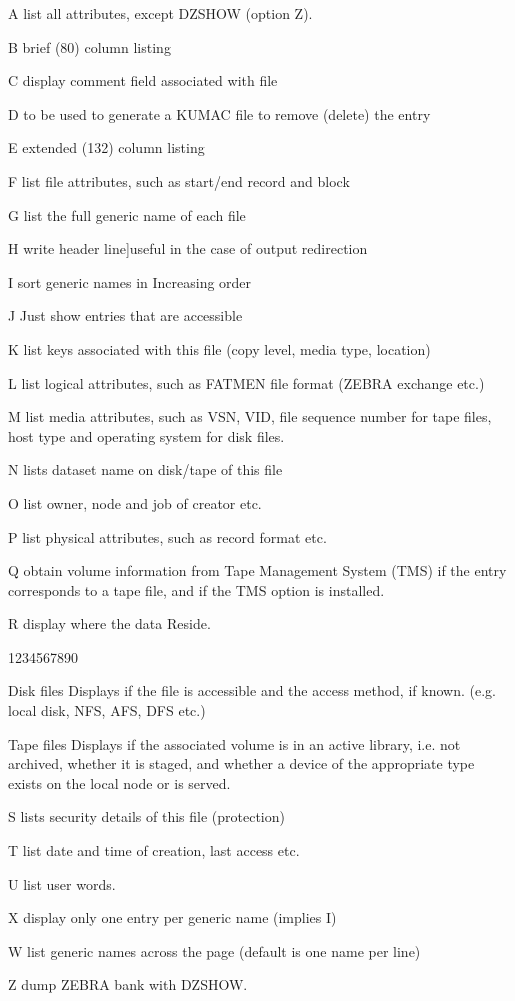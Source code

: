 \begin{DLtt}{12}
\item[A]list all attributes, except DZSHOW (option Z).
\item[B]brief (80) column listing
\item[C]display comment field associated with file
\item[D]to be used to generate a KUMAC file to remove (delete) the entry
\item[E]extended (132) column listing
\item[F]list file attributes, such as start/end record and block
\item[G]list the full generic name of each file
\item[H]write header line]useful in the case of output redirection 
\item[I]sort generic names in Increasing order
\item[J]Just show entries that are accessible
\item[K]list keys associated with this file (copy level, media type, location)
\item[L]list logical attributes, such as FATMEN file format
(ZEBRA exchange etc.)
\item[M]list media attributes, such as VSN, VID, file sequence number for tape
files, host type and operating system for disk files.
\item[N]lists dataset name on disk/tape of this file
\item[O]list owner, node and job of creator etc.
\item[P]list physical attributes, such as record format etc.
\item[Q]obtain volume information from Tape Management System (TMS)
if the entry corresponds to a tape file, and if the TMS
option is installed.
\item[R]display where the data Reside. 
\begin{DLtt}{1234567890}
\item[Disk files]Displays if the file is accessible and the access method, if
known. (e.g. local disk, NFS, AFS, DFS etc.)
\item[Tape files]Displays if the associated volume is in an active library,
i.e. not archived, whether it is staged, and whether a device of the appropriate
type exists on the local node or is served.
\end{DLtt}
\item[S]lists security details of this file (protection)
\item[T]list date and time of creation, last access etc.
\item[U]list user words.
\item[X]display only one entry per generic name (implies I)
\item[W]list generic names across the page (default is one name per line)
\item[Z]dump ZEBRA bank with DZSHOW.
\end{DLtt}


